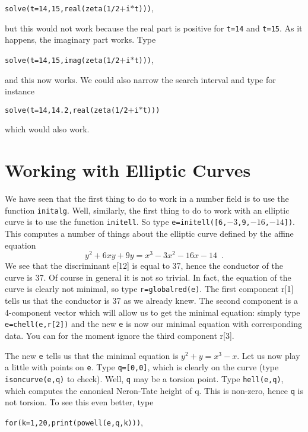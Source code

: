 {\tt solve(t=14,15,real(zeta(1/2$+$i$*$t)))},

but this would not work because
the real part is positive for {\tt t=14} and {\tt t=15}. As it happens, the
imaginary part works. Type 

{\tt solve(t=14,15,imag(zeta(1/2$+$i$*$t)))},

and this now works. We could also narrow the search interval and type for
instance 

{\tt solve(t=14,14.2,real(zeta(1/2$+$i$*$t)))} 

which would also work.
\medskip
\section{Working with Elliptic Curves}
\medskip
We have seen that the first thing to do to work in a number field is to use
the function {\tt initalg}. Well, similarly, the first thing to do to work
with an elliptic curve is to use the function {\tt initell}. So type
{\tt e=initell([6,$-3$,9,$-16$,$-14$])}. This computes a number of things
about the elliptic curve defined by the affine equation
$$y^2+6xy+9y=x^3-3x^2-16x-14\enspace.$$ We see that the discriminant
e[12] is equal to 37, hence the conductor of the curve is 37. Of course in 
general it is not so trivial. In fact, the equation of the curve is clearly
not minimal, so type {\tt r=globalred(e)}. The first component r[1] tells
us that the conductor is 37 as we already knew. The second component is a
4-component vector which will allow us to get the minimal equation:
simply type {\tt e=chell(e,r[2])} and the new {\tt e} is now our minimal
equation with corresponding data. You can for the moment ignore the third
component r[3].

The new {\tt e} tells us that the minimal equation is $y^2+y=x^3-x$.
Let us now play a little with points on {\tt e}. Type {\tt q=[0,0]}, which is
clearly on the curve (type {\tt isoncurve(e,q)} to check). Well, {\tt q} may
be a torsion point. Type {\tt hell(e,q)}, which computes the canonical
Neron-Tate height of q. This is non-zero, hence {\tt q} is not torsion. To see
this even better, type 

{\tt for(k=1,20,print(powell(e,q,k)))},

